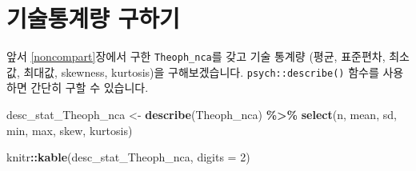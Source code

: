 \documentclass[
  10pt,
]{krantz}
\makeatletter
\newenvironment{Shaded}{\begin{snugshade}}{\end{snugshade}}
\newcommand{\DataTypeTok}[1]{\textcolor[rgb]{0.13,0.29,0.53}{#1}}
\newcommand{\DecValTok}[1]{\textcolor[rgb]{0.00,0.00,0.81}{#1}}
\newcommand{\KeywordTok}[1]{\textcolor[rgb]{0.13,0.29,0.53}{\textbf{#1}}}
\newcommand{\NormalTok}[1]{#1}
\newcommand{\OperatorTok}[1]{\textcolor[rgb]{0.81,0.36,0.00}{\textbf{#1}}}
\newcommand{\StringTok}[1]{\textcolor[rgb]{0.31,0.60,0.02}{#1}}
\newenvironment{kframe}{%
\medskip{}
\setlength{\fboxsep}{.8em}
 \def\at@end@of@kframe{}%
 \ifinner\ifhmode%
  \def\at@end@of@kframe{\end{minipage}}%
  \begin{minipage}{\columnwidth}%
 \fi\fi%
 \def\FrameCommand##1{\hskip\@totalleftmargin \hskip-\fboxsep
 \colorbox{shadecolor}{##1}\hskip-\fboxsep
     \hskip-\linewidth \hskip-\@totalleftmargin \hskip\columnwidth}%
 \MakeFramed {\advance\hsize-\width
   \@totalleftmargin\z@ \linewidth\hsize
   \@setminipage}}%
 {\par\unskip\endMakeFramed%
 \at@end@of@kframe}
\renewenvironment{Shaded}{\begin{kframe}}{\end{kframe}}
\makeatother
\begin{document}
\hypertarget{stat-desc}{%
\section{기술통계량 구하기}\label{stat-desc}}

앞서 \ref{noncompart}장에서 구한 \texttt{Theoph\_nca}를 갖고 기술 통계량 (평균, 표준편차, 최소값, 최대값, skewness, kurtosis)을 구해보겠습니다. \texttt{psych::describe()} 함수를 사용하면 간단히 구할 수 있습니다.

\begin{Shaded}
\begin{Highlighting}[]
\NormalTok{desc\_stat\_Theoph\_nca \textless{}{-}}\StringTok{ }\KeywordTok{describe}\NormalTok{(Theoph\_nca) }\OperatorTok{\%\textgreater{}\%}\StringTok{ }
\StringTok{  }\KeywordTok{select}\NormalTok{(n, mean, sd, min, max, skew, kurtosis)}

\NormalTok{knitr}\OperatorTok{::}\KeywordTok{kable}\NormalTok{(desc\_stat\_Theoph\_nca, }\DataTypeTok{digits =} \DecValTok{2}\NormalTok{)}
\end{Highlighting}
\end{Shaded}
\end{document}

